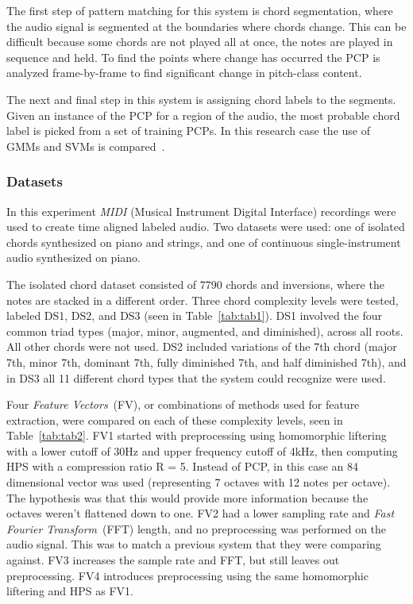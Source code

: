 \documentclass{sig-alternate}
\begin{document}
The first step of pattern matching for this system is chord segmentation, where the audio signal is segmented at the boundaries where chords change. This can be difficult because some chords are not played all at once, the notes are played in sequence and held. To find the points where change has occurred the PCP is analyzed frame-by-frame to find significant change in pitch-class content. 


The next and final step in this system is assigning chord labels to the segments. Given an instance of the PCP for a region of the audio, the most probable chord label is picked from a set of training PCPs. In this research case the use of GMMs and SVMs is compared~\cite{Morman:2006}.

\subsubsection{Datasets}

In this experiment \textit{MIDI} (Musical Instrument Digital Interface) recordings were used to create time aligned labeled audio. Two datasets were used: one of isolated chords synthesized on piano and strings, and one of continuous single-instrument audio synthesized on piano. 

The isolated chord dataset consisted of 7790 chords and inversions, where the notes are stacked in a different order. Three chord complexity levels were tested, labeled DS1, DS2, and DS3 (seen in Table~\ref{tab:tab1}). DS1 involved the four common triad types (major, minor, augmented, and diminished), across all roots. All other chords were not used. DS2 included variations of the 7th chord (major 7th, minor 7th, dominant 7th, fully diminished 7th, and half diminished 7th), and in DS3 all 11 different chord types that the system could recognize were used.

Four \textit{Feature Vectors}~(FV), or combinations of methods used for feature extraction, were compared on each of these complexity levels, seen in Table~\ref{tab:tab2}. FV1 started with preprocessing using homomorphic liftering with a lower cutoff of 30Hz and upper frequency cutoff of 4kHz, then computing HPS with a compression ratio R = 5. Instead of PCP, in this case an 84 dimensional vector was used (representing 7 octaves with 12 notes per octave). The hypothesis was that this would provide more information because the octaves weren't flattened down to one. FV2 had a lower sampling rate and \textit{Fast Fourier Transform}~(FFT) length, and no preprocessing was performed on the audio signal. This was to match a previous system that they were comparing against. FV3 increases the sample rate and FFT, but still leaves out preprocessing. FV4 introduces preprocessing using the same homomorphic liftering and HPS as FV1.
\end{document}

